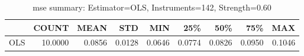 \begin{table}[ht]
\centering
\caption{mse summary: Estimator=OLS, Instruments=142, Strength=0.60}
\begin{tabular}{lrrrrrrrr}
\toprule
 & COUNT & MEAN & STD & MIN & 25\% & 50\% & 75\% & MAX \\
\midrule
OLS & 10.0000 & 0.0856 & 0.0128 & 0.0646 & 0.0774 & 0.0826 & 0.0950 & 0.1046 \\
\bottomrule
\end{tabular}
\end{table}

